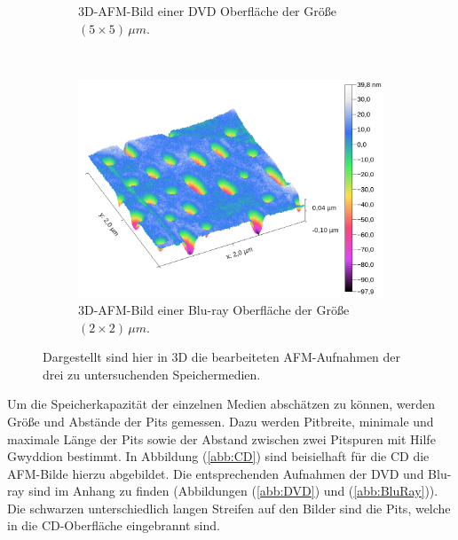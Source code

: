 \begin{figure}[H]
\begin{subfigure}[t]{0.45\textwidth}
	\caption{3D-AFM-Bild einer DVD Oberfl\"ache der Gr\"o{\ss}e $(5 \times 5) \, \mu m$.}
	\label{abb:dvd_3d}
	\end{subfigure}
	~
	\begin{subfigure}[t]{0.45\textwidth}
	\includegraphics[width=\textwidth]{AFM_auswertung/bluray_3d.png}
	\caption{3D-AFM-Bild einer Blu-ray Oberfl\"ache der Gr\"o{\ss}e $(2 \times 2) \, \mu m$.}
	\label{abb:br_3d}
	\end{subfigure}
\caption{Dargestellt sind hier in 3D die bearbeiteten AFM-Aufnahmen der drei zu untersuchenden Speichermedien.}
\label{abb:3d}
\end{figure}
Um die Speicherkapazit\"at der einzelnen Medien absch\"atzen zu k\"onnen, werden Gr\"o{\ss}e und Abst\"ande der Pits gemessen.
Dazu werden Pitbreite, minimale und maximale L\"ange der Pits sowie der Abstand zwischen zwei Pitspuren mit Hilfe Gwyddion bestimmt.
In Abbildung (\ref{abb:CD}) sind beisielhaft f\"ur die CD die AFM-Bilde hierzu abgebildet.
Die entsprechenden Aufnahmen der DVD und Blu-ray sind im Anhang zu finden (Abbildungen (\ref{abb:DVD}) und (\ref{abb:BluRay})).
Die schwarzen unterschiedlich langen Streifen auf den Bilder sind die Pits, welche in die CD-Oberfl\"ache eingebrannt sind.
